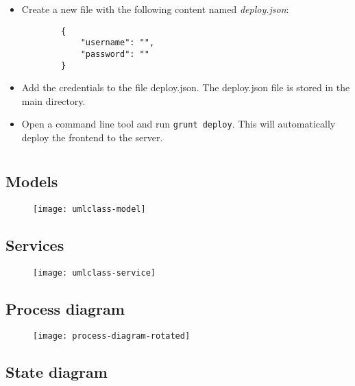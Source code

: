 \begin{itemize}

    \item Create a new file with the following content named \textit{deploy.json}:
    \begin{lstlisting}
        {
            "username": "",
            "password": "" 
        }   
    \end{lstlisting}
    \item Add the credentials to the file deploy.json. The deploy.json file is stored in the main directory.
    \item Open a command line tool and run \texttt{grunt deploy}. This will automatically deploy the frontend to the server. 

\end{itemize}

\chapter{}

\section{Models}
\label{sec:app-models}

\begin{figure}[H]
    {\texttt{[image: umlclass-model]}}
\end{figure}

\section{Services}
\label{sec:app-service}

\begin{figure}[H]
    {\texttt{[image: umlclass-service]}}
\end{figure}

\section{Process diagram}
\label{sec:process-diagram-rotated}

\begin{figure}[H]
    {\texttt{[image: process-diagram-rotated]}}
\end{figure}

\section{State diagram}
\label{sec:state-diagram}

